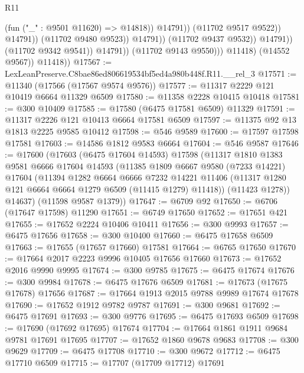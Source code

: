 \begin{lexlean}{R11}
\begin{coremodule}
                                              (fun ("_" : @9501 @11620) => @14818))
                                            @14791))
                                        (@11702 @9517 @9522))
                                      @14791))
                                  (@11702 @9480 @9523))
                                @14791))
                            (@11702 @9437 @9532))
                          @14791))
                      (@11702 @9342 @9541))
                    @14791))
                (@11702 @9143 @9550)))
            @11418)
          (@14552 @9567))
        @11418))
@17567 := LexLeanPreserve.C8bae86ed806619534bf5ed4a980b448f.R11.__rel_3
@17571 := @11340 (@17566 (@17567 @9574 @9576))
@17577 := @11317 @2229 @121 @10419 @6664 @11329 @6509
@17580 := @11358 @2228 @10415 @10418
@17581 := @300 @10409
@17585 := @17580 (@6475 @17581 @6509) @11329
@17591 := @11317 @2226 @121 @10413 @6664 @17581 @6509
@17597 := @11375 @92 @13 @1813 @2225 @9585 @10412
@17598 := @546 @9589
@17600 := @17597 @17598 @17581
@17603 := @14586 @1812 @9583 @6664
@17604 := @546 @9587
@17646 := @17600
    (@17603
      (@6475 @17604 @14593)
      @17598
      (@11317
        @1810
        @1383
        @9581
        @6666
        @17604
        @14593
        (@11385
          @1809
          @6667
          @9580
          (@7233 @14221)
          @17604
          (@11394
            @1282
            @6664
            @6666
            @7232
            @14221
            @11406
            (@11317 @1280 @121 @6664 @6664 @1279 @6509 (@11415 @1279) @11418))
          (@11423 @1278))
        @14637)
      (@11598 @9587 @1379))
@17647 := @6709 @92
@17650 := @6706 (@17647 @17598) @11290
@17651 := @6749 @17650
@17652 := @17651 @421
@17655 := @17652 @2224 @10406 @10411
@17656 := @300 @9993
@17657 := @6475 @17656
@17658 := @300 @10400
@17660 := @6475 @17658 @6509
@17663 := @17655 (@17657 @17660) @17581
@17664 := @6765 @17650
@17670 := @17664 @2017 @2223 @9996 @10405 @17656 @17660
@17673 := @17652 @2016 @9990 @9995
@17674 := @300 @9785
@17675 := @6475 @17674
@17676 := @300 @9984
@17678 := @6475 @17676 @6509
@17681 := @17673 (@17675 @17678) @17656
@17687 := @17664 @1913 @2015 @9788 @9989 @17674 @17678
@17690 := @17652 @1912 @9782 @9787
@17691 := @300 @9681
@17692 := @6475 @17691
@17693 := @300 @9776
@17695 := @6475 @17693 @6509
@17698 := @17690 (@17692 @17695) @17674
@17704 := @17664 @1861 @1911 @9684 @9781 @17691 @17695
@17707 := @17652 @1860 @9678 @9683
@17708 := @300 @9629
@17709 := @6475 @17708
@17710 := @300 @9672
@17712 := @6475 @17710 @6509
@17715 := @17707 (@17709 @17712) @17691

\end{coremodule}
\end{lexlean}
